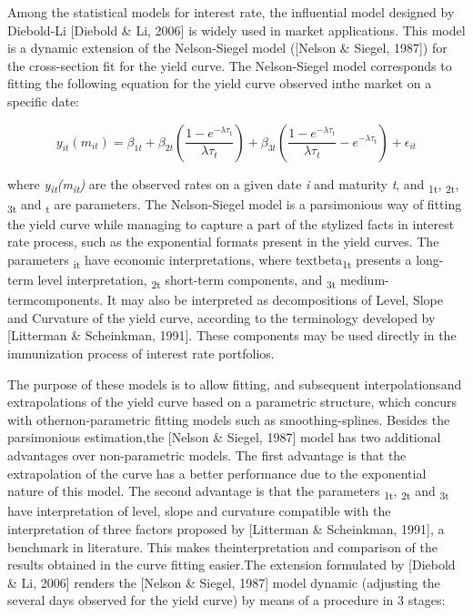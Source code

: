 \documentclass{article}
\begin{document}
Among the statistical models for interest rate, the influential model designed by Diebold-Li [Diebold \& Li, 2006] is widely used in market applications. This model is a dynamic extension of the Nelson-Siegel model ([Nelson \& Siegel, 1987]) for the cross-section fit for the yield curve. The Nelson-Siegel model corresponds to fitting the following equation for the yield curve observed inthe market on a specific date:

\begin{equation}
y_{it}(m_{it})=\beta_{1t}+\beta_{2t}\left ( \frac{1-e^{-\lambda\tau_t}}{\lambda\tau_t} \right )+\beta_{3t}\left ( \frac{1-e^{-\lambda\tau_t}}{\lambda\tau_t} -e^{-\lambda\tau_t}\right )+ \epsilon_{it}
\end{equation}

where \textit{y\textsubscript{it}(m\textsubscript{it})} are the observed rates on a given date \textit{i} and maturity \textit{t}, and \textbeta\textsubscript{1t}, \textbeta\textsubscript{2t}, \textbeta\textsubscript{3t} 
and \texttau\textsubscript{t} are parameters. The Nelson-Siegel model is a parsimonious way of fitting the yield curve while managing to capture a part of the stylized facts in interest rate process, such as the exponential formats present in the yield curves.  The parameters \textbeta\textsubscript{it} have economic interpretations, where textbeta\textsubscript{1t} presents a long-term level interpretation, \textbeta\textsubscript{2t} short-term components, and \textbeta\textsubscript{3t} medium-termcomponents. It may also be interpreted as decompositions of Level, Slope and Curvature of the yield curve, according to the terminology developed by [Litterman \& Scheinkman, 1991]. These components may be used directly in the immunization process of interest rate portfolios. 

The purpose of these models is to allow fitting, and subsequent interpolationsand extrapolations of the yield curve based on a parametric structure, which concurs with othernon-parametric fitting models such as smoothing-splines. Besides the parsimonious estimation,the [Nelson \& Siegel, 1987] model 
has two additional advantages over non-parametric models. The first advantage is that the extrapolation of the curve has a better performance due to the exponential nature of this model.  The second advantage is that the parameters \textbeta\textsubscript{1t}, \textbeta\textsubscript{2t} and \textbeta\textsubscript{3t} have interpretation of level, slope and curvature compatible with the interpretation of three factors proposed by [Litterman \& Scheinkman, 1991], a benchmark in literature. This makes theinterpretation and comparison of the results obtained in the curve fitting easier.The extension formulated by [Diebold \& Li, 2006] renders the [Nelson \& Siegel, 1987] model dynamic (adjusting the several days observed for the yield curve) by means of a procedure in 3 stages:
\end{document}
